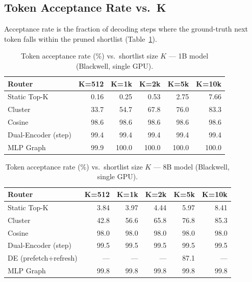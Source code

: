 \documentclass[twocolumn,10pt]{article}
\newcommand{\tblhead}[1]{\textbf{#1}}
\begin{document}
\subsection{Token Acceptance Rate vs.\ K}

Acceptance rate is the fraction of decoding steps where the ground-truth next
token falls within the pruned shortlist (Table~\ref{tab:acceptance}).

\begin{table}[t]
\centering
\caption{Token acceptance rate (\%) vs.\ shortlist size $K$ --- 1B model (Blackwell, single GPU).}
\label{tab:acceptance}
\small
\begin{tabular}{@{}lrrrrr@{}}
\toprule
\tblhead{Router} & \tblhead{K=512} & \tblhead{K=1k} & \tblhead{K=2k} & \tblhead{K=5k} & \tblhead{K=10k} \\
\midrule
Static Top-K         & 0.16 & 0.25 & 0.53 & 2.75 & 7.66 \\
Cluster              & 33.7 & 54.7 & 67.8 & 76.0 & 83.3 \\
Cosine               & 98.6 & 98.6 & 98.6 & 98.6 & 98.6 \\
Dual-Encoder (step)  & 99.4 & 99.4 & 99.4 & 99.4 & 99.4 \\
MLP Graph            & 99.9 & 100.0 & 100.0 & 100.0 & 100.0 \\
\bottomrule
\end{tabular}
\end{table}

\begin{table}[t]
\centering
\caption{Token acceptance rate (\%) vs.\ shortlist size $K$ --- 8B model (Blackwell, single GPU).}
\label{tab:acceptance-8b}
\small
\begin{tabular}{@{}lrrrrr@{}}
\toprule
\tblhead{Router} & \tblhead{K=512} & \tblhead{K=1k} & \tblhead{K=2k} & \tblhead{K=5k} & \tblhead{K=10k} \\
\midrule
Static Top-K          & 3.84 & 3.97 & 4.44 & 5.97 & 8.41 \\
Cluster               & 42.8 & 56.6 & 65.8 & 76.8 & 85.3 \\
Cosine                & 98.0 & 98.0 & 98.0 & 98.0 & 98.0 \\
Dual-Encoder (step)   & 99.5 & 99.5 & 99.5 & 99.5 & 99.5 \\
DE (prefetch+refresh) & ---  & ---  & ---  & 87.1 & ---  \\
MLP Graph             & 99.8 & 99.8 & 99.8 & 99.8 & 99.8 \\
\bottomrule
\end{tabular}
\end{table}
\end{document}
